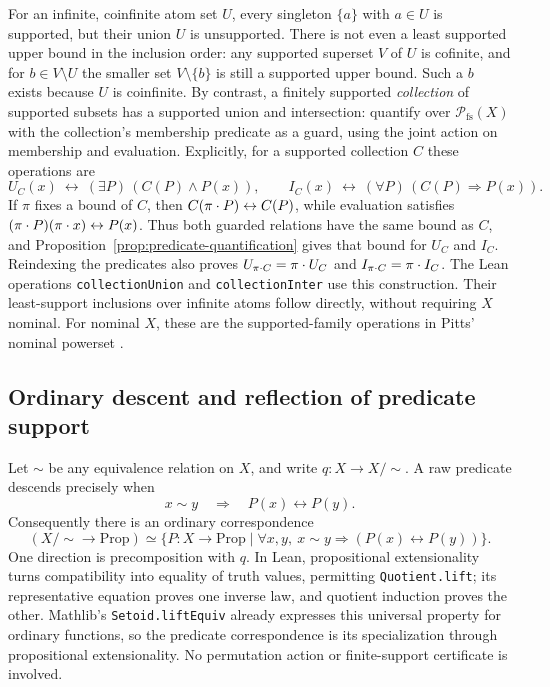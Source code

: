 For an infinite, coinfinite atom set $U$, every singleton $\{a\}$ with
$a\in U$ is supported, but their union $U$ is unsupported. There is not even
a least supported upper bound in the inclusion order: any supported superset
$V$ of $U$ is cofinite, and for $b\in V\setminus U$ the smaller set
$V\setminus\{b\}$ is still a supported upper bound. Such a $b$ exists because
$U$ is coinfinite. By contrast, a finitely supported
\emph{collection} of supported subsets has a supported union and intersection:
quantify over $\mathcal P_{\mathrm{fs}}(X)$ with the collection's membership
predicate as a guard, using the joint action on membership and evaluation.
Explicitly, for a supported collection $C$ these operations are
\[
 U_C(x)\ \longleftrightarrow\ (\exists P)\,(C(P)\wedge P(x)),
 \qquad
 I_C(x)\ \longleftrightarrow\ (\forall P)\,(C(P)\Rightarrow P(x)).
\]
If $\pi$ fixes a bound of $C$, then $C(\pi\mathbin{\cdot} P)\leftrightarrow C(P)$,
while evaluation satisfies $(\pi\mathbin{\cdot} P)(\pi\mathbin{\cdot} x)\leftrightarrow P(x)$.
Thus both guarded relations have the same bound as $C$, and
Proposition~\ref{prop:predicate-quantification} gives that bound for $U_C$
and $I_C$. Reindexing the predicates also proves
$U_{\pi\mathbin{\cdot} C}=\pi\mathbin{\cdot} U_C$ and $I_{\pi\mathbin{\cdot} C}=\pi\mathbin{\cdot} I_C$.
The Lean operations \texttt{collectionUnion} and \texttt{collectionInter}
use this construction. Their least-support inclusions over infinite atoms
follow directly, without requiring $X$ nominal.
For nominal $X$, these are the supported-family operations in Pitts' nominal powerset
\cite[Section~2.5 and Example~11.1]{pitts2013}.

\subsection{Ordinary descent and reflection of predicate support}
\label{sec:predicate-descent}

Let $\sim$ be any equivalence relation on $X$, and write $q:X\to X/{\sim}$.
A raw predicate descends precisely when
\[
  x\sim y\quad\Longrightarrow\quad P(x)\leftrightarrow P(y).
\]
Consequently there is an ordinary correspondence
\[
 (X/{\sim}\to\mathrm{Prop})
 \simeq
 \{P:X\to\mathrm{Prop}\mid
       \forall x,y,\ x\sim y\Rightarrow(P(x)\leftrightarrow P(y))\}.
\]
One direction is precomposition with $q$. In Lean, propositional
extensionality turns compatibility into equality of truth values, permitting
\texttt{Quotient.lift}; its representative equation proves one inverse law,
and quotient induction proves the other. Mathlib's \texttt{Setoid.liftEquiv}
already expresses this universal property for ordinary functions, so the
predicate correspondence is its specialization through propositional
extensionality. No permutation action or finite-support certificate is involved.


